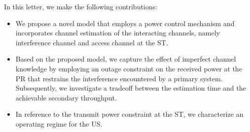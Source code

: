 \documentclass[12pt, draftclsnofoot, onecolumn]{IEEEtran}
\begin{document}
In this letter, we make the following contributions: 
\begin{itemize}
\item 
We propose a novel model that employs a power control mechanism and incorporates channel estimation of the interacting channels, namely interference channel and access channel at the ST. %
\item Based on the proposed model, we capture the effect of imperfect channel knowledge by employing an outage constraint on the received power at the PR that restrains the interference encountered by a primary system. Subsequently, we investigate a tradeoff between the estimation time and the achievable secondary throughput. %
\item In reference to the transmit power constraint at the ST, we characterize an operating regime for the US. 

\end{itemize}

\end{document}
